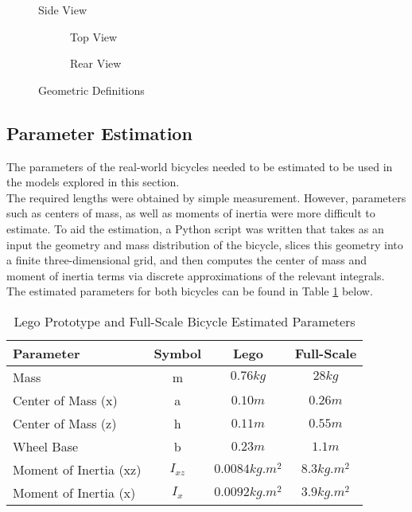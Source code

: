 \begin{figure}[H]
	\centering
    \def\svgwidth{0.5\textwidth}
    
    \caption{Side View}
	\label{fig:geometry}
\end{figure}

\begin{figure}[H]
	\centering
	\begin{subfigure}[t]{0.4\textwidth}
		\centering
    	
    	\caption{Top View}
    \end{subfigure}
    \begin{subfigure}[t]{0.4\textwidth}
    	\centering
    	
    	\caption{Rear View}
    \end{subfigure}
    \caption{Geometric Definitions}
    \label{fig:geometry2}
\end{figure}

\subsection{Parameter Estimation}
The parameters of the real-world bicycles needed to be estimated to be used in the models explored in this section. \\

The required lengths were obtained by simple measurement. However, parameters such as centers of mass, as well as moments of inertia were more difficult to estimate. To aid the estimation, a Python script was written that takes as an input the geometry and mass distribution of the bicycle, slices this geometry into a finite three-dimensional grid, and then computes the center of mass and moment of inertia terms via discrete approximations of the relevant integrals. \\

The estimated parameters for both bicycles can be found in Table \ref{table:LegoFSParams} below.

\begin{table}[H]
	\centering
 	\begin{tabular}[t]{lccc} 
	\toprule
	Parameter & Symbol & Lego & Full-Scale \\
 	\midrule
 	Mass & m & $0.76\si{kg}$ & $28\si{kg}$\\
 	Center of Mass (x) & a & $0.10\si{m}$ & $0.26\si{m}$\\ 
 	Center of Mass (z) & h & $0.11\si{m}$ & $0.55\si{m}$\\
 	Wheel Base & b & $0.23\si{m}$ & $1.1\si{m}$\\
 	Moment of Inertia (xz) & $I_{xz}$ & $0.0084\si{kg.m^2}$ & $8.3\si{kg.m^2}$\\
 	Moment of Inertia (x)& $I_x$ & $0.0092\si{kg.m^2}$ & $3.9\si{kg.m^2}$\\
 	\bottomrule
	\end{tabular}
 	\caption{Lego Prototype and Full-Scale Bicycle Estimated Parameters}
	\label{table:LegoFSParams}
\end{table}

